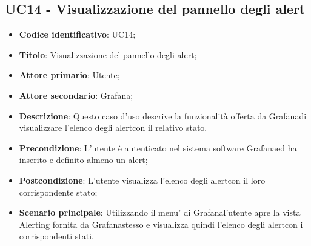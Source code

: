 \subsection{UC14 - Visualizzazione del pannello degli alert}
\begin{itemize}
	\item \textbf{Codice identificativo}: UC14;
	\item \textbf{Titolo}: Visualizzazione del pannello degli alert\glo;
	\item \textbf{Attore primario}: Utente;
	\item \textbf{Attore secondario}: Grafana\glo;
	\item \textbf{Descrizione}: Questo caso d'uso descrive la funzionalità offerta da Grafana\glosp di visualizzare l'elenco degli alert\glosp con il relativo stato.
	\item \textbf{Precondizione}: L'utente è autenticato nel sistema software Grafana\glosp ed ha inserito e definito almeno un alert\glo;
	\item \textbf{Postcondizione}: L'utente visualizza l'elenco degli alert\glosp con il loro corrispondente stato;
	\item \textbf{Scenario principale}: Utilizzando il menu' di Grafana\glosp l'utente apre la vista Alerting fornita da Grafana\glosp stesso e visualizza quindi l'elenco degli alert\glosp con i corrispondenti stati.
\end{itemize} 
